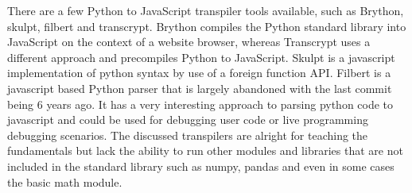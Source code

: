 There are a few Python to JavaScript transpiler tools available, such as Brython, skulpt, filbert and transcrypt. Brython compiles the Python standard library into JavaScript on the context of a website browser, whereas Transcrypt uses a different approach and precompiles Python to JavaScript. Skulpt is a javascript implementation of python syntax by use of a foreign function API. Filbert is a javascript based Python parser that is largely abandoned with the last commit being 6 years ago. It has a very interesting approach to parsing python code to javascript and could be used for debugging user code or live programming debugging scenarios. The discussed transpilers are alright for teaching the fundamentals but lack the ability to run other modules and libraries that are not included in the standard library such as numpy, pandas and even in some cases the basic math module.